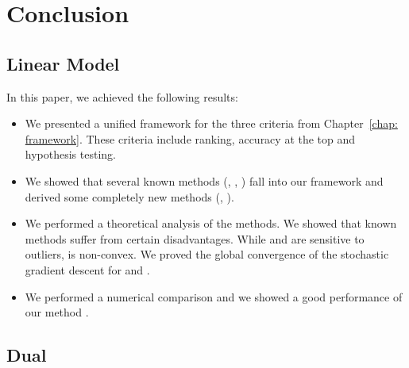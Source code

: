 

\section{Conclusion}

\subsection{Linear Model}

In this paper, we achieved the following results:
\begin{itemize}
  \item We presented a unified framework for the three criteria from Chapter~\ref{chap: framework}. These criteria include ranking, accuracy at the top and hypothesis testing.
  \item We showed that several known methods (\TopPush, \Grill, \tauFPL) fall into our framework and derived some completely new methods (\PatMat, \PatMatNP).
  \item We performed a theoretical analysis of the methods. We showed that known methods suffer from certain disadvantages. While \TopPush and \tauFPL are sensitive to outliers, \Grill is non-convex. We proved the global convergence of the stochastic gradient descent for \PatMat and \PatMatNP.
  \item We performed a numerical comparison and we showed a good performance of our method \PatMatNP.
\end{itemize}


\subsection{Dual}\label{sec:Conclusion}

